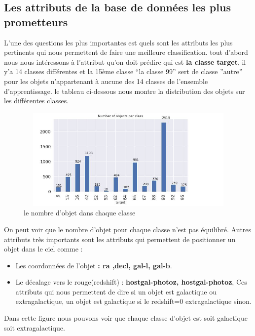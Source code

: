 \newline
\subsection{Les attributs de la base de données les plus prometteurs}
L’une des questions les plus importantes est quels sont les attributs les plus pertinents qui nous permettent de faire une meilleure classification. tout d’abord nous nous intéressons à l’attribut qu’on doit prédire qui est \textbf{la classe target}, il y’a 14 classes différentes et la 15ème classe “la classe 99” sert de classe ”autre” pour les objets n’appartenant à aucune des 14 classes de l’ensemble d’apprentissage.
\newpage
le tableau ci-dessous nous montre la distribution des objets sur les différentes classes.
\begin{figure}[!h]
    \centering
    \includegraphics[width=15cm,height=5cm]{report/figures/objet-class.jpg}
    \caption{le nombre d'objet dans chaque classe}
    \label{fig:my_label}
\end{figure}
\newline
On peut voir que le nombre d'objet pour chaque classe n'est pas équilibré.
\newline
\newline
Autres attributs très importants sont les attributs qui permettent de positionner un objet dans le ciel comme :
\begin{itemize}
    \item Les coordonnées de l’objet \textbf{: ra ,decl, gal-l, gal-b}.
    \item Le décalage vers le rouge(redshift) :\textbf{ hostgal-photoz, hostgal-photoz}, Ces attributs qui nous permettent de dire si un objet est galactique ou extragalactique, un objet est galactique si le redshift=0 extragalactique sinon.
\end{itemize}

Dans cette figure nous pouvons voir que chaque classe d'objet est soit galactique soit extragalactique.

